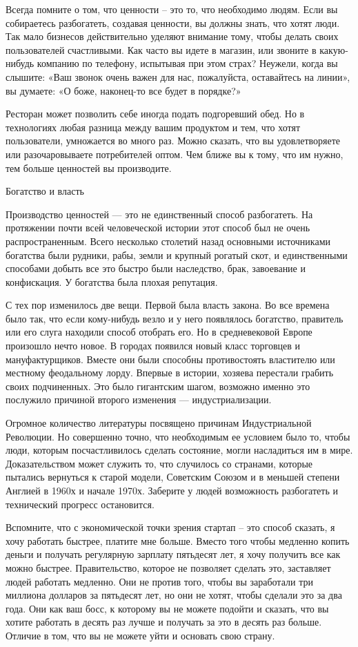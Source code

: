 \documentclass[ebook,12pt,oneside,openany]{memoir}
\begin{document}
Всегда помните о том, что ценности – это то, что необходимо людям.
Если вы собираетесь разбогатеть, создавая ценности, вы должны знать,
что хотят люди. Так мало бизнесов действительно уделяют внимание тому,
чтобы делать своих пользователей счастливыми. Как часто вы идете в
магазин, или звоните в какую-нибудь компанию по телефону, испытывая
при этом страх? Неужели, когда вы слышите: «Ваш звонок очень важен для
нас, пожалуйста, оставайтесь на линии», вы думаете: «О боже,
наконец-то все будет в порядке?»

Ресторан может позволить себе иногда подать подгоревший обед. Но в
технологиях любая разница между вашим продуктом и тем, что хотят
пользователи, умножается во много раз. Можно сказать, что вы
удовлетворяете или разочаровываете потребителей оптом. Чем ближе вы к
тому, что им нужно, тем больше ценностей вы производите.

Богатство и власть

Производство ценностей — это не единственный способ разбогатеть. На
протяжении почти всей человеческой истории этот способ был не очень
распространенным. Всего несколько столетий назад основными источниками
богатства были рудники, рабы, земли и крупный рогатый скот, и
единственными способами добыть все это быстро были наследство, брак,
завоевание и конфискация. У богатства была плохая репутация.

С тех пор изменилось две вещи. Первой была власть закона. Во все
времена было так, что если кому-нибудь везло и у него появлялось
богатство, правитель или его слуга находили способ отобрать его. Но в
средневековой Европе произошло нечто новое. В городах появился новый
класс торговцев и мануфактурщиков. Вместе они были способны
противостоять властителю или местному феодальному лорду. Впервые в
истории, хозяева перестали грабить своих подчиненных. Это было
гигантским шагом, возможно именно это послужило причиной второго
изменения — индустриализации.

Огромное количество литературы посвящено причинам Индустриальной
Революции. Но совершенно точно, что необходимым ее условием было то,
чтобы люди, которым посчастливилось сделать состояние, могли
насладиться им в мире. Доказательством может служить то, что случилось
со странами, которые пытались вернуться к старой модели, Советским
Союзом и в меньшей степени Англией в 1960х и начале 1970х. Заберите у
людей возможность разбогатеть и технический прогресс остановится.

Вспомните, что с экономической точки зрения стартап – это способ
сказать, я хочу работать быстрее, платите мне больше. Вместо того
чтобы медленно копить деньги и получать регулярную зарплату пятьдесят
лет, я хочу получить все как можно быстрее. Правительство, которое не
позволяет сделать это, заставляет людей работать медленно. Они не
против того, чтобы вы заработали три миллиона долларов за пятьдесят
лет, но они не хотят, чтобы сделали это за два года. Они как ваш босс,
к которому вы не можете подойти и сказать, что вы хотите работать в
десять раз лучше и получать за это в десять раз больше. Отличие в том,
что вы не можете уйти и основать свою страну.
\end{document}
